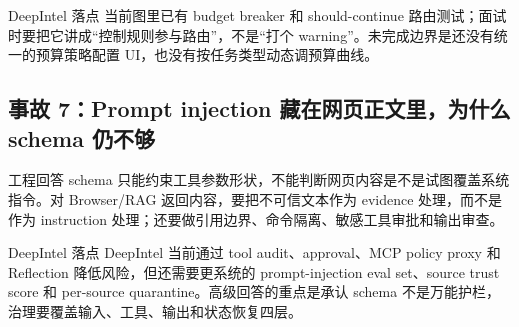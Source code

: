 \begin{analysisBox}{DeepIntel 落点}
当前图里已有 budget breaker 和 should-continue 路由测试；面试时要把它讲成“控制规则参与路由”，不是“打个 warning”。未完成边界是还没有统一的预算策略配置 UI，也没有按任务类型动态调预算曲线。
\end{analysisBox}

\subsection{事故 7：Prompt injection 藏在网页正文里，为什么 schema 仍不够}
\begin{qaBox}{工程回答}
schema 只能约束工具参数形状，不能判断网页内容是不是试图覆盖系统指令。对 Browser/RAG 返回内容，要把不可信文本作为 evidence 处理，而不是作为 instruction 处理；还要做引用边界、命令隔离、敏感工具审批和输出审查。
\end{qaBox}

\begin{analysisBox}{DeepIntel 落点}
DeepIntel 当前通过 tool audit、approval、MCP policy proxy 和 Reflection 降低风险，但还需要更系统的 prompt-injection eval set、source trust score 和 per-source quarantine。高级回答的重点是承认 schema 不是万能护栏，治理要覆盖输入、工具、输出和状态恢复四层。
\end{analysisBox}
